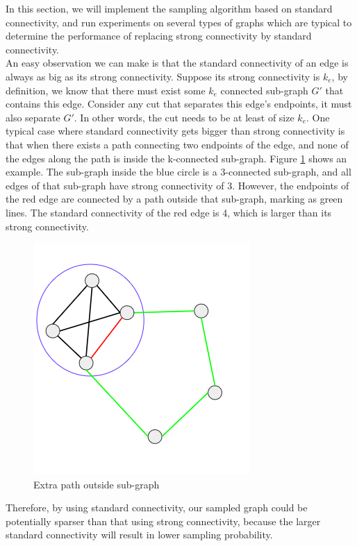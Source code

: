 \documentclass{article}
\begin{document}
In this section, we will implement the sampling algorithm based on standard connectivity, and run experiments on several types of graphs which are typical to determine the performance of replacing strong connectivity by standard connectivity. \\

An easy observation we can make is that the standard connectivity of an edge is always as big as its strong connectivity. Suppose its strong connectivity is $k_e$, by definition, we know that there must exist some $k_e$ connected sub-graph $G'$ that contains this edge. Consider any cut that separates this edge's endpoints, it must also separate $G'$. In other words, the cut needs to be at least of size $k_e$. One typical case where standard connectivity gets bigger than strong connectivity is that when there exists a path connecting two endpoints of the edge, and none of the edges along the path is inside the k-connected sub-graph. Figure \ref{fig:StandardC} shows an example. The sub-graph inside the blue circle is a 3-connected sub-graph, and all edges of that sub-graph have strong connectivity of 3. However, the endpoints of the red edge are connected by a path outside that sub-graph, marking as green lines. The standard connectivity of the red edge is 4, which is larger than its strong connectivity. \\

\begin{figure}[h!]
\centering
\includegraphics[scale=0.4]{images/standard_bigger_strong.png}
\caption{Extra path outside sub-graph}
\label{fig:StandardC}
\end{figure}

Therefore, by using standard connectivity, our sampled graph could be potentially sparser than that using strong connectivity, because the larger standard connectivity will result in lower sampling probability.
\end{document}
